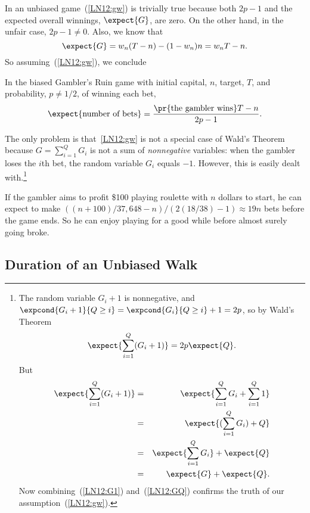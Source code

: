 In an unbiased game~(\ref{LN12:gw}) is trivially true because both $2p-1$ and
the expected overall winnings, $\expect{G}$, are zero.
On the other hand, in the unfair case, $2p-1 \neq 0$.  Also, we know that
\[
\expect{G} = w_n(T-n) - (1-w_n)n = w_nT-n.
\]
So assuming~(\ref{LN12:gw}), we conclude
\begin{theorem}\label{LN12:ExQthm}
In the biased Gambler's Ruin game with initial capital, $n$, target,
$T$, and probability, $p \neq 1/2$, of winning each bet,
\begin{equation}\label{LN12:ExQ}
\expect{\text{number of bets}} =
\frac{\pr{\text{the gambler wins}}T-n}{2p-1}.
\end{equation}
\end{theorem}

The only problem is that~\eqref{LN12:gw} is not a special case of Wald's
Theorem because $G = \sum_{i=1}^Q G_i$ is not a sum of \emph{nonnegative}
variables: when the gambler loses the $i$th bet, the random variable $G_i$
equals $-1$.  However, this is easily dealt with.\footnote{The random variable
$G_i+1$ is nonnegative, and $\expcond{G_i+1}{Q \geq i} =
\expcond{G_i}{Q\geq i}+1 = 2p$, so by Wald's Theorem
\begin{equation}\label{LN12:G1}
\expect{\sum_{i=1}^Q (G_i+1)}  = 2p\expect{Q}.
\end{equation}
But
\begin{eqnarray}
\expect{\sum_{i=1}^Q (G_i+1)} & = & \expect{\sum_{i=1}^Q G_i + \sum_{i=1}^Q 1}\notag\\
   & = & \expect{(\sum_{i=1}^Q G_i) + Q}\notag\\
   & = & \expect{\sum_{i=1}^Q G_i} + \expect{Q}\notag\\
   & = & \expect{G} + \expect{Q}\label{LN12:GQ}.
\end{eqnarray}
Now combining~(\ref{LN12:G1}) and~(\ref{LN12:GQ}) confirms the truth of our
assumption~(\ref{LN12:gw}).}

\begin{example}
If the gambler aims to profit \$100 playing roulette with $n$ dollars to
start, he can expect to make $((n+100)/37,648 - n)/(2(18/38) - 1) \approx
19n$ bets before the game ends.  So he can enjoy playing for a good while
before almost surely going broke.
\end{example}

\subsection{Duration of an Unbiased Walk}

